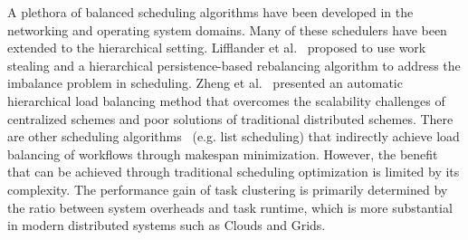 \documentclass[final]{IEEEtran}
\begin{document}


A plethora of balanced scheduling algorithms have been developed in the networking and operating system domains. Many of these schedulers have been extended to the hierarchical setting. Lifflander et al.~\cite{Lifflander} proposed to use work stealing and a hierarchical persistence-based rebalancing algorithm to address the imbalance problem in scheduling. Zheng et al.~\cite{Zheng} presented an automatic hierarchical load balancing method that overcomes the scalability challenges of centralized schemes and poor solutions of traditional distributed schemes. There are other scheduling algorithms~\cite{Braun2001} (e.g. list scheduling) that indirectly achieve load balancing of workflows through makespan minimization. However, the benefit that can be achieved through traditional scheduling optimization is limited by its complexity. The performance gain of task clustering is primarily determined by the ratio between system overheads and task runtime, which is more substantial in modern distributed systems such as Clouds and Grids. 


\end{document}
